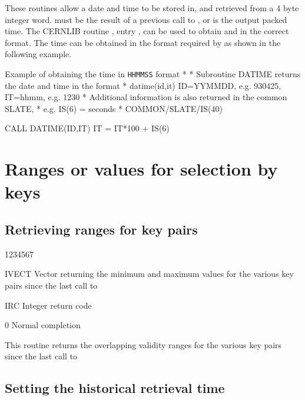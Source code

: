 These routines
allow a date and time to be stored in, and retrieved from
a 4 byte integer word.
 must be the result of a previous call to ,
or is the output packed time. The CERNLIB routine ,
entry , can be
used to obtain  and  in the correct format.
The time can be obtained in the  format
required by  as shown in the following example.
\begin{XMPt}{Example of obtaining the time in {\tt HHMMSS} format}
*
*     Subroutine DATIME returns the date and time in the format
*     datime(id,it) ID=YYMMDD, e.g. 930425, IT=hhmm, e.g. 1230
*     Additional information is also returned in the common SLATE,
*     e.g. IS(6) = seconds
*
      COMMON/SLATE/IS(40)

      CALL DATIME(ID,IT)
      IT = IT*100 + IS(6)
\end{XMPt}

\section{Ranges or values for selection by keys}

\subsection{Retrieving ranges for key pairs}


\begin{DLtt}{1234567}
\item[IVECT]Vector returning the minimum and maximum values
for the various key pairs since the last call to 
\item[IRC]Integer return code
  \begin{DLtt}{1}
    \item[0]Normal completion
  \end{DLtt}
\end{DLtt}

This routine returns the overlapping validity ranges for
the various key pairs since the last call to 

\subsection{Setting the historical retrieval time}

